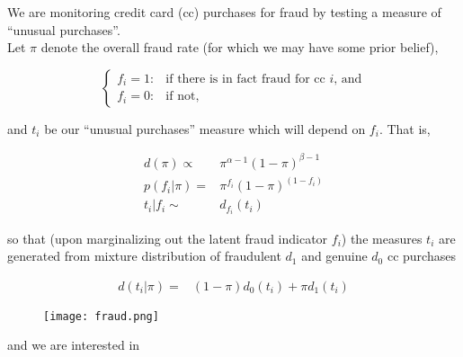 \documentclass[11pt, oneside]{article}
\begin{document}

We are monitoring credit card (cc) purchases for fraud by testing a measure of ``unusual purchases''.\\

Let $\pi$ denote the overall fraud rate (for which we may have some prior belief), 

$$ \left\{  \begin{array}{ll} 
    f_i=1: & \textrm{if there is in fact fraud for cc $i$, and} \\
    f_i=0: & \textrm{if not,} 
   \end{array} \right.$$

\noindent and $t_i$ be our ``unusual purchases'' measure which will depend on $f_i$.  That is, 

\begin{align*}
d(\pi) \propto{}& \pi^{\alpha-1}(1-\pi)^{\beta-1} \\
p(f_i|\pi) ={}& \pi^{f_i}(1-\pi)^{(1-f_i)}  \\
t_i|f_i \sim{}& d_{f_i}(t_i) 
\end{align*}

\noindent so that (upon marginalizing out the latent fraud indicator $f_i$) the measures $t_i$ are generated from mixture distribution of fraudulent $d_{1}$ and genuine $d_{0}$ cc purchases 

\begin{align*}
d(t_i|\pi) ={}& (1-\pi)d_{0}(t_i) + \pi d_{1}(t_i)  
\end{align*}

\vspace{-1.5em}
\begin{figure}[h!]
   \centering
\texttt{[image: fraud.png]}  
\end{figure}  

\noindent and we are interested in 
\end{document}

